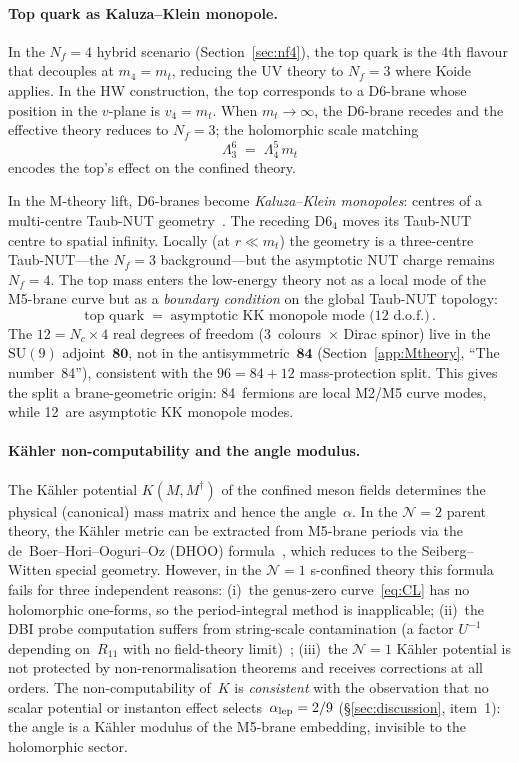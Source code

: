 \documentclass[12pt,a4paper]{article}
\newcommand{\SU}{\mathrm{SU}}
\newcommand{\Nf}{N_f}
\begin{document}
\paragraph{Top quark as Kaluza--Klein monopole.}
In the $\Nf = 4$ hybrid scenario (Section~\ref{sec:nf4}), the top
quark is the 4th flavour that decouples at $m_4 = m_t$, reducing
the UV theory to $\Nf = 3$ where Koide applies.  In the HW
construction, the top corresponds to a D6-brane whose position
in the $v$-plane is $v_4 = m_t$.  When $m_t \to \infty$, the
D6-brane recedes and the effective theory reduces to
$\Nf = 3$; the holomorphic scale matching
\begin{equation}
  \Lambda_3^6 \;=\; \Lambda_4^5\,m_t
  \label{eq:scale_matching}
\end{equation}
encodes the top's effect on the confined theory.

In the M-theory lift, D6-branes become
\emph{Kaluza--Klein monopoles}: centres of a multi-centre
Taub-NUT geometry~\cite{Townsend:1995}.  The receding D6$_4$ moves
its Taub-NUT centre to spatial infinity.  Locally (at $r \ll m_t$)
the geometry is a three-centre Taub-NUT---the $\Nf = 3$
background---but the asymptotic NUT charge remains~$\Nf = 4$.
The top mass enters the low-energy theory not as a local mode of the
M5-brane curve but as a \emph{boundary condition} on the
global Taub-NUT topology:
\[
  \text{top quark} \;=\;
  \text{asymptotic KK monopole mode (12~d.o.f.)}\,.
\]
The $12 = N_c \times 4$ real degrees of freedom
($3$~colours~$\times$ Dirac spinor) live in the $\SU(9)$
adjoint~$\mathbf{80}$, not in the antisymmetric~$\mathbf{84}$
(Section~\ref{app:Mtheory}, ``The number~84''), consistent with
the $96 = 84 + 12$ mass-protection split.  This gives the split a
brane-geometric origin: 84~fermions are local M2/M5 curve modes,
while 12~are asymptotic KK monopole modes.

\paragraph{K\"ahler non-computability and the angle modulus.}
The K\"ahler potential $K(M, M^\dagger)$ of the confined meson
fields determines the physical (canonical) mass matrix and hence the
angle~$\alpha$.  In the $\mathcal{N}=2$ parent theory, the
K\"ahler metric can be extracted from M5-brane periods via the
de~Boer--Hori--Ooguri--Oz (DHOO) formula~\cite{deBoer:1997DHOO},
which reduces to the Seiberg--Witten special geometry.  However, in
the $\mathcal{N}=1$ s-confined theory this formula fails for three
independent reasons:
(i)~the genus-zero curve~\eqref{eq:CL} has no holomorphic one-forms,
so the period-integral method is inapplicable;
(ii)~the DBI probe computation suffers from string-scale
contamination (a factor $U^{-1}$ depending on~$R_{11}$ with no
field-theory limit)~\cite{deBoer:1997DHOO};
(iii)~the $\mathcal{N}=1$ K\"ahler potential is not protected by
non-renormalisation theorems and receives corrections at all
orders.
The non-computability of~$K$ is \emph{consistent} with the
observation that no scalar potential or instanton effect
selects~$\alpha_{\rm lep} = 2/9$
(\S\ref{sec:discussion}, item~1): the angle is a K\"ahler
modulus of the M5-brane embedding, invisible to the holomorphic
sector.
\end{document}

